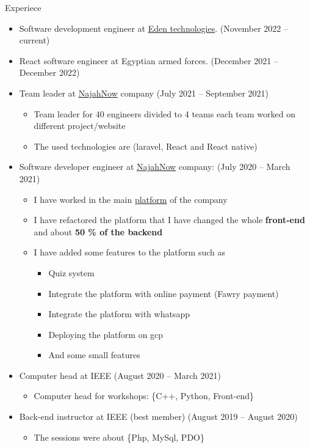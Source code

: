 \documentclass{resume}
\begin{document}
\begin{rSection}{Experiece}
    \begin{itemize}
        \item Software development engineer at \href{https://najahnow.net}{Eden technologies}. \hfill{(November 2022 – current)}
        \item React software engineer at Egyptian armed forces. \hfill{(December 2021 – December 2022)}
        \item Team leader at \href{https://eden-tech.io}{NajahNow} company \hfill{(July 2021 – September 2021)}
        \begin{itemize}
            \item Team leader for 40 engineers divided to 4 teams each team worked on different project/website
            \item The used technologies are (laravel, React and React native)
        \end{itemize}
        
        \item Software developer engineer at \href{https://najahnow.net}{NajahNow} company: \hfill{(July 2020 – March 2021)}
        \begin{itemize}
            \item I have worked in the main \href{https://najahnow.net}{platform} of the company
            \item I have refactored the platform that I have changed the whole \textbf{front-end} and about \textbf{50 \% of the backend}
            \item I have added some features to the platform such as 
            \begin{itemize}
                \item Quiz system 
                \item Integrate the platform with online payment (Fawry payment)
                \item Integrate the platform with whatsapp 
                \item Deploying the platform on gcp
                \item And some small features
            \end{itemize}
        \end{itemize}

        \item Computer head at IEEE \hfill{(August 2020 – March 2021)}
        \begin{itemize}
            \item Computer head for workshops: \{C++, Python, Front-end\}
        \end{itemize}
        \item Back-end instructor at IEEE (best member) \hfill{(August 2019 – August 2020)}
        \begin{itemize}
            \item The sessions were about \{Php, MySql, PDO\}
        \end{itemize}
    \end{itemize}
\end{rSection}
\end{document}
